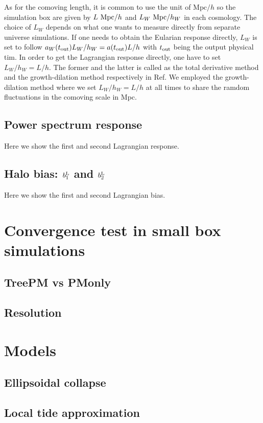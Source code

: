 \documentclass[a4paper,11pt]{article}
\begin{document}
As for the comoving length, it is common to use the unit of $\mathrm{Mpc}/h$ so the simulation box are given by
$L~{\rm Mpc}/h$ and $L_W~{\rm Mpc}/h_W$ in each cosmology.
The choice of $L_W$ depends on what one wants to measure directly from separate universe simulations.
If one needs to obtain the Eularian response directly, $L_W$ is set to follow $a_W(t_{\rm out})L_W/h_W = a(t_{\rm out})L/h$ 
with $t_{\rm out}$ being the output physical tim.
In order to get the Lagrangian response directly, one have to set $L_W/h_W = L/h$.
The former and the latter is called as the total derivative method and the growth-dilation method respectively in Ref.
We employed the growth-dilation method where we set $L_W/h_W = L/h$ at all times to share the ramdom fluctuations 
in the comoving scale in Mpc.

\subsection{Power spectrum response}  
Here we show the first and second Lagrangian response.

\subsection{Halo bias: $b_1^{\rm L}$ and $b_2^{\rm L}$} 
Here we show the first and second Lagrangian bias.

\section{Convergence test in small box simulations}
\label{app:250}

\subsection{TreePM vs PMonly}
\label{app:250}

\subsection{Resolution}
\label{app:250}



\section{Models}
\label{sec:models}


\subsection{Ellipsoidal collapse}
\label{sub:ellip}

\subsection{Local tide approximation}
\label{sub:lta}






\end{document}
